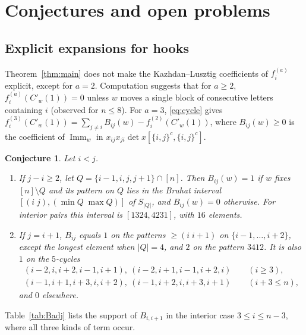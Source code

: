 \documentclass[11pt]{amsart}
\newtheorem{conjecture}[theorem]{Conjecture}
\theoremstyle{definition}
\theoremstyle{remark}
\newcommand{\Imm}{\operatorname{Imm}}
\newcommand{\Cp}[1]{C'_{#1}(1)}
\begin{document}
\section{Conjectures and open problems}\label{sec:open}

\subsection{Explicit expansions for hooks}
Theorem~\ref{thm:main} does not make the Kazhdan--Lusztig coefficients of $f^{(a)}_i$ explicit, except for $a=2$. Computation suggests that for $a\ge2$, $f^{(a)}_i(\Cp w)=0$ unless $w$ moves a single block of consecutive letters containing $i$ (observed for $n\le8$). For $a=3$, \eqref{eq:cycle} gives $f^{(3)}_i(\Cp w)=\sum_{j\ne i}B_{ij}(w)-f^{(2)}_i(\Cp w)$, where $B_{ij}(w)\ge0$ is the coefficient of $\Imm_w$ in $x_{ij}x_{ji}\det x[\{i,j\}^c,\{i,j\}^c]$.

\begin{conjecture}\label{conj:B}
Let $i<j$.
\begin{enumerate}
\item If $j-i\ge2$, let $Q=\{i-1,i,j,j+1\}\cap[n]$. Then $B_{ij}(w)=1$ if $w$ fixes $[n]\setminus Q$ and its pattern on $Q$ lies in the Bruhat interval $[(i\;j),(\min Q\;\max Q)]$ of $S_{|Q|}$, and $B_{ij}(w)=0$ otherwise. For interior pairs this interval is $[1324,4231]$, with $16$ elements.
\item If $j=i+1$, $B_{ij}$ equals $1$ on the patterns $\ge(i\;i{+}1)$ on $\{i-1,\dots,i+2\}$, except the longest element when $|Q|=4$, and $2$ on the pattern $3412$. It is also $1$ on the $5$-cycles
  \begin{gather*}
  (i{-}2,i,i{+}2,i{-}1,i{+}1),\ (i{-}2,i{+}1,i{-}1,i{+}2,i)\qquad (i\ge3),\\
  (i{-}1,i{+}1,i{+}3,i,i{+}2),\ (i{-}1,i{+}2,i,i{+}3,i{+}1)\qquad (i+3\le n),
  \end{gather*}
  and $0$ elsewhere.
\end{enumerate}
\end{conjecture}

Table~\ref{tab:Badj} lists the support of $B_{i,i+1}$ in the interior case $3\le i\le n-3$, where all three kinds of term occur.
\end{document}
